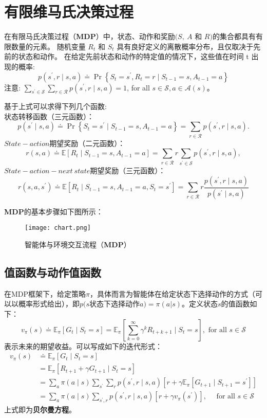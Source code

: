 \section{有限维马氏决策过程}
\cite{sutton2018reinforcement}在有限马氏决策过程（\textbf{MDP}）中，状态、动作和奖励$(S,\ A$ 和 $R)$的集合都具有有限数量的元素。
随机变量 $R_{t}$ 和 $S_{t}$ 具有良好定义的离散概率分布，且仅取决于先前的状态和动作。
在给定先前状态和动作的特定值的情况下，这些值在时间 $\mathrm{t}$ 出现的概率:
$$
p\left(s^{\prime}, r \mid s, a\right) \doteq \operatorname{Pr}\left\{S_{t}=s^{\prime}, R_{t}=r \mid S_{t-1}=s, A_{t-1}=a\right\}
$$
注意:
$\sum_{s^{\prime} \in \mathcal{S}} \sum_{r \in \mathcal{R}} p\left(s^{\prime}, r \mid s, a\right)=1$, for all $s \in \mathcal{S}, a \in \mathcal{A}(s)$。

基于上式可以求得下列几个函数:
\\
状态转移函数（三元函数）：
$$
p\left(s^{\prime} \mid s, a\right) \doteq \operatorname{Pr}\left\{S_{t}=s^{\prime} \mid S_{t-1}=s, A_{t-1}=a\right\}=\sum_{r \in \mathcal{R}} p\left(s^{\prime}, r \mid s, a\right) .
$$
$State-action$期望奖励（二元函数）：
$$
r(s, a) \doteq \mathbb{E}\left[R_{t} \mid S_{t-1}=s, A_{t-1}=a\right]=\sum_{r \in \mathcal{R}} r \sum_{s^{\prime} \in \mathcal{S}} p\left(s^{\prime}, r \mid s, a\right),
$$
$State-action-next\ state$期望奖励（三元函数）：
$$
r\left(s, a, s^{\prime}\right) \doteq \mathbb{E}\left[R_{t} \mid S_{t-1}=s, A_{t-1}=a, S_{t}=s^{\prime}\right]=\sum_{r \in \mathcal{R}} r \frac{p\left(s^{\prime}, r \mid s, a\right)}{p\left(s^{\prime} \mid s, a\right)}
$$

\textbf{MDP}的基本步骤如下图所示：
\begin{figure}[hbt]
    \centering
    \texttt{[image: chart.png]}
    \caption{智能体与环境交互流程（\textbf{MDP}）}
    \label{MDP_agent}
\end{figure}
\subsection{值函数与动作值函数}
在MDP框架下，给定策略$\pi$，具体而言为智能体在给定状态下选择动作的方式（可以以概率形式给出），即$p(s$状态下选择动作$a)=\pi(a|s)$。定义状态$s$的值函数如下：
$$
v_{\pi}(s) \doteq \mathbb{E}_{\pi}\left[G_{t} \mid S_{t}=s\right]=\mathbb{E}_{\pi}\left[\sum_{k=0}^{\infty} \gamma^{k} R_{t+k+1} \mid S_{t}=s\right], \text { for all } s \in \mathcal{S}
$$
表示未来的期望收益。可以写成如下的迭代形式：
$$
\begin{aligned}
v_{\pi}(s) & \doteq \mathbb{E}_{\pi}\left[G_{t} \mid S_{t}=s\right] \\
&=\mathbb{E}_{\pi}\left[R_{t+1}+\gamma G_{t+1} \mid S_{t}=s\right] \\
&=\sum_{a} \pi(a \mid s) \sum_{s^{\prime}} \sum_{r} p\left(s^{\prime}, r \mid s, a\right)\left[r+\gamma \mathbb{E}_{\pi}\left[G_{t+1} \mid S_{t+1}=s^{\prime}\right]\right] \\
&=\sum_{a} \pi(a \mid s) \sum_{s^{\prime}, r} p\left(s^{\prime}, r \mid s, a\right)\left[r+\gamma v_{\pi}\left(s^{\prime}\right)\right], \quad \text { for all } s \in \mathcal{S}
\end{aligned}
$$
上式即为\textbf{贝尔曼方程}。

